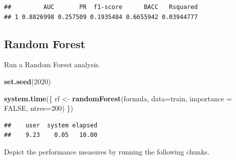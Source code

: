 \documentclass[]{article}
\newenvironment{Shaded}{\begin{snugshade}}{\end{snugshade}}
\newcommand{\DataTypeTok}[1]{\textcolor[rgb]{0.13,0.29,0.53}{#1}}
\newcommand{\DecValTok}[1]{\textcolor[rgb]{0.00,0.00,0.81}{#1}}
\newcommand{\KeywordTok}[1]{\textcolor[rgb]{0.13,0.29,0.53}{\textbf{#1}}}
\newcommand{\NormalTok}[1]{#1}
\newcommand{\OperatorTok}[1]{\textcolor[rgb]{0.81,0.36,0.00}{\textbf{#1}}}
\newcommand{\OtherTok}[1]{\textcolor[rgb]{0.56,0.35,0.01}{#1}}
\newcommand{\StringTok}[1]{\textcolor[rgb]{0.31,0.60,0.02}{#1}}
\begin{document}
\begin{Shaded}
\end{Shaded}

\begin{verbatim}
##         AUC       PR  f1-score      BACC   Rsquared
## 1 0.8826998 0.257509 0.1935484 0.6655942 0.03944777
\end{verbatim}

\hypertarget{random-forest}{%
\subsection{Random Forest}\label{random-forest}}

Run a Random Forest analysis.

\begin{Shaded}
\begin{Highlighting}[]
\KeywordTok{set.seed}\NormalTok{(}\DecValTok{2020}\NormalTok{)}

\KeywordTok{system.time}\NormalTok{(\{}
\NormalTok{rf <-}\StringTok{ }\KeywordTok{randomForest}\NormalTok{(formula, }\DataTypeTok{data=}\NormalTok{train,}
                   \DataTypeTok{importance =} \OtherTok{FALSE}\NormalTok{,}
                   \DataTypeTok{ntree=}\DecValTok{200}\NormalTok{)}
\NormalTok{\})}
\end{Highlighting}
\end{Shaded}

\begin{verbatim}
##    user  system elapsed 
##    9.23    0.05   10.00
\end{verbatim}

Depict the performance measures by running the following chunks.
\end{document}
